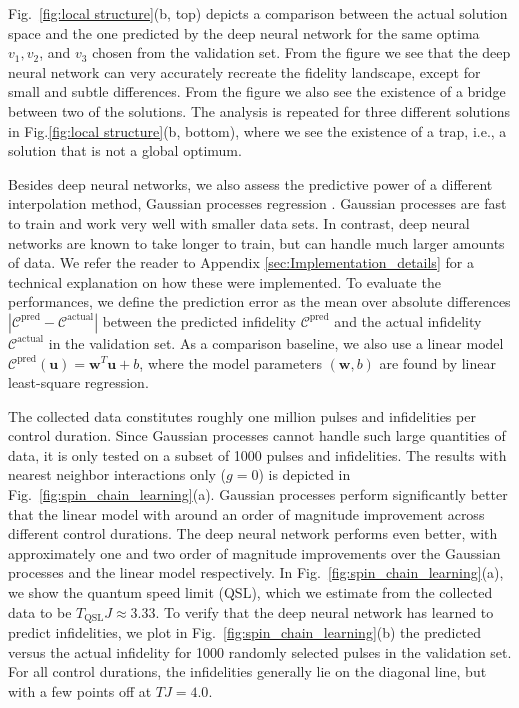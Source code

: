 \documentclass[aps, twocolumn,superscriptaddress]{revtex4-1}
\begin{document}
Fig.~\ref{fig:local structure}(b, top) depicts a comparison between the actual solution space and the one predicted by the deep neural network for the same optima $v_1, v_2$, and $v_3$ chosen from the validation set.  From the figure we  see that the deep neural network can very accurately recreate the fidelity landscape, except for small and subtle differences. From the figure we also see the existence of a bridge between two of the solutions. The analysis is repeated for three different solutions in Fig.\ref{fig:local structure}(b, bottom), where we see the existence of a trap, i.e., a solution that is not a global optimum.

Besides deep neural networks, we also assess the predictive power of a different interpolation method, Gaussian processes regression \cite{rasmussen2003gaussian}. Gaussian processes are fast to train and work very well with smaller data sets. In contrast, deep neural networks are known to take longer to train, but can handle much larger amounts of data. We refer the reader to Appendix \ref{sec:Implementation_details} for a technical explanation on how these were implemented. To evaluate the performances, we define the prediction error as the mean over absolute differences $|\mathcal{C}^{\text{pred}}-\mathcal{C}^{\text{actual}}|$ between the predicted infidelity $\mathcal{C}^{\text{pred}}$ and the actual infidelity $\mathcal{C}^{\text{actual}}$ in the validation set. As a comparison baseline, we also use a linear model $\mathcal{C}^{\text{pred}}(\mathbf{u}) = \mathbf{w}^T \mathbf{u} + b$, where the model parameters $(\mathbf{w}, b)$ are found by linear least-square regression. 


The collected data constitutes roughly one million pulses and infidelities per control duration. Since Gaussian processes cannot handle such large quantities of data, it is only tested on a subset of 1000 pulses and infidelities. The results with nearest neighbor interactions only ($g = 0$) is depicted in Fig.~\ref{fig:spin_chain_learning}(a). Gaussian processes perform significantly better that the linear model with around an order of magnitude improvement across different control durations. The deep neural network performs even better, with approximately one and two order of magnitude improvements over the Gaussian processes and the linear model respectively. In Fig.~\ref{fig:spin_chain_learning}(a), we show the quantum speed limit (QSL), which we estimate from the collected data to be $T_{\text{QSL}}J \approx 3.33$. To verify that the deep neural network has learned to predict infidelities, we plot in Fig.~\ref{fig:spin_chain_learning}(b) the predicted versus the actual infidelity for 1000 randomly selected pulses in the validation set. For all control durations, the infidelities generally lie on the diagonal line, but with a few points off at $TJ = 4.0$. 
\end{document}

